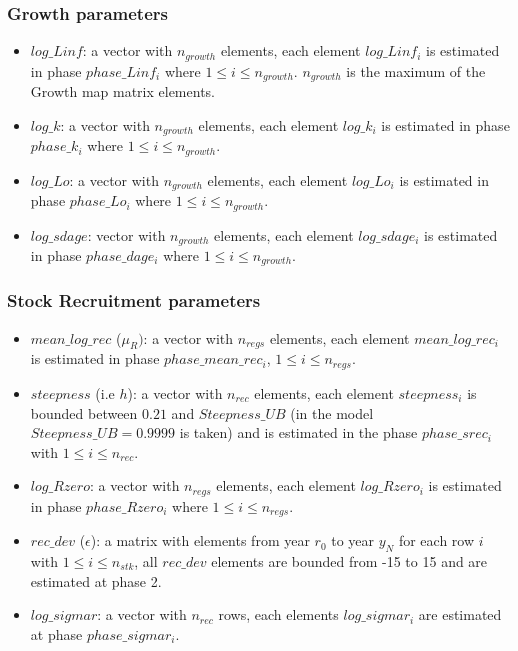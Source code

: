 \documentclass{article}
\begin{document}
\subsubsection{Growth parameters}
\begin{itemize}
   
    \item $log\_Linf$: a vector with $n_{growth}$ elements, each element $log\_Linf_i$ is estimated in phase $phase\_Linf_i$ where $1\leq i \leq n_{growth}$. $n_{growth}$ is the maximum of the Growth map matrix elements.
    
    \item $log\_k$: a vector with $n_{growth}$ elements, each element $log\_k_i$ is estimated in phase $phase\_k_i$ where $1\leq i \leq n_{growth}$.
    
    \item $log\_Lo$: a vector with $n_{growth}$ elements, each element $log\_Lo_i$ is estimated in phase $phase\_Lo_i$ where $1 \leq i \leq n_{growth}$.
    
    \item $log\_sdage$: vector with $n_{growth}$ elements, each element $log\_sdage_i$ is estimated in phase $phase\_dage_i$ where $1 \leq i \leq n_{growth}$.
    
\end{itemize}
    
\subsubsection{Stock Recruitment parameters}

\begin{itemize}
    
    \item $mean\_log\_rec $ ($\mu_{R})$: a vector with $n_{regs}$ elements, each element $mean\_log\_rec_i$ is estimated in phase $phase\_mean\_rec_i$, $1 \leq i \leq n_{regs}$. 
    
    \item $steepness$ (i.e $h$): a vector with $n_{rec}$ elements, each element $steepness_i$ is bounded between $0.21$ and $Steepness\_UB$ (in the model $Steepness\_UB=0.9999$ is taken) and is estimated in the phase $phase\_srec_i$ with $1\leq i \leq n_{rec}$.
    
    \item $log\_Rzero$: a vector with $n_{regs}$ elements, each element $log\_Rzero_i$ is estimated in phase $phase\_Rzero_i$ where $1 \leq i \leq n_{regs}$.
    
    \item $rec\_dev$ ($\epsilon$): a matrix with elements from year $r_0$ to year $y_N$ for each row $i$ with $1\leq i \leq n_{stk}$, all $rec\_dev$ elements are bounded from -15 to 15 and are estimated at phase 2.
    
    \item $log\_sigmar$: a vector with $n_{rec}$ rows, each elements $log\_sigmar_i$  are estimated at phase $phase\_sigmar_i$.
    
\end{itemize}
\end{document}
